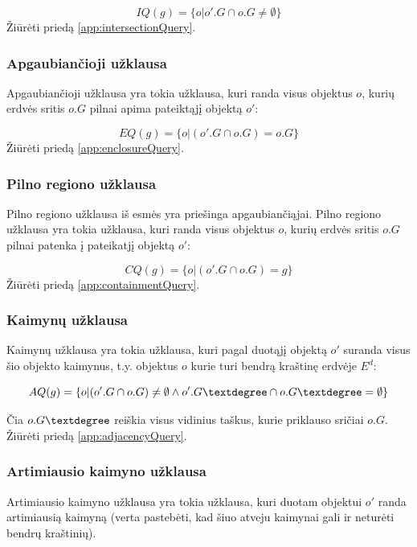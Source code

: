 \begin{equation}
	IQ(g) = \{ o | o'.G \cap o.G \neq \emptyset \}
\label{eq:ExactMatchQuery}
\end{equation}
Žiūrėti priedą \ref{app:intersectionQuery}.

\subsubsection{Apgaubiančioji užklausa}
Apgaubiančioji užklausa yra tokia užklausa, kuri randa visus objektus $o$, kurių erdvės sritis $o.G$ pilnai apima pateiktąjį objektą $o'$:

\begin{equation}
	EQ(g) = \{ o | (o'.G \cap o.G) = o.G \}
\label{eq:ExactMatchQuery}
\end{equation}
Žiūrėti priedą \ref{app:enclosureQuery}.


\subsubsection{Pilno regiono užklausa}
Pilno regiono užklausa iš esmės yra priešinga apgaubiančiąjai.
Pilno regiono užklausa yra tokia užklausa, kuri randa visus objektus $o$, kurių erdvės sritis $o.G$ pilnai patenka į pateikatjį objektą $o'$:

\begin{equation}
	CQ(g) = \{ o | (o'.G \cap o.G) = g \}
\label{eq:ExactMatchQuery}
\end{equation}
Žiūrėti priedą \ref{app:containmentQuery}.


\subsubsection{Kaimynų užklausa}
Kaimynų užklausa yra tokia užklausa, kuri pagal duotąjį objektą $o'$ suranda visus šio objekto kaimynus, t.y. objektus $o$ kurie turi bendrą kraštinę erdvėje $E^d$:

\begin{equation}
	AQ(g) = \{ o | (o'.G \cap o.G) \neq \emptyset \land o'.G\textdegree \cap o.G\textdegree = \emptyset \}
\label{eq:ExactMatchQuery}
\end{equation}

Čia $o.G\textdegree$ reiškia visus vidinius taškus, kurie priklauso sričiai $o.G$.
Žiūrėti priedą \ref{app:adjacencyQuery}.


\subsubsection{Artimiausio kaimyno užklausa}
Artimiausio kaimyno užklausa yra tokia užklausa, kuri duotam objektui $o'$ randa artimiausią kaimyną (verta pastebėti, kad šiuo atveju kaimynai gali ir neturėti bendrų kraštinių).

